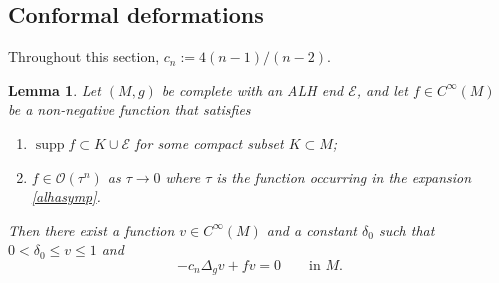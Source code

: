 \documentclass[10pt,a4paper]{amsart}
\numberwithin{equation}{section}
\newtheorem{Lemma}[Theorem]{Lemma}
\def\Ecal{\mathcal{E}}
\def\Ocal{\mathcal{O}}
\def\supp{\operatorname{supp}}
\begin{document}
\subsection{Conformal deformations}
Throughout this section, $c_n:= 4(n-1)/(n-2)$.

\begin{Lemma}\label{confSubSol}
Let $(M,g)$ be complete with an ALH end $\Ecal$,
and let $f\in C^\infty(M)$ be a non-negative function that satisfies
\begin{enumerate}\itemsep=0pt
\item[$(a)$] $\supp f \subset K\cup \Ecal$ for some compact subset $K\subset M$;
\item[$(b)$] $f \in \Ocal(\tau^{n})$ as $\tau\rightarrow 0$ where $\tau$ is the function occurring in the expansion
		\eqref{alhasymp}.
\end{enumerate}
Then there exist a function $v\in C^\infty(M)$ and a constant $\delta_0$ such that  $0<\delta_0 \le v\le 1$ and
\begin{equation}\label{confLemma_veqn}
    -c_n \Delta_g v + fv = 0 \qquad\mbox{in } M.
\end{equation}
\end{Lemma}
\end{document}
